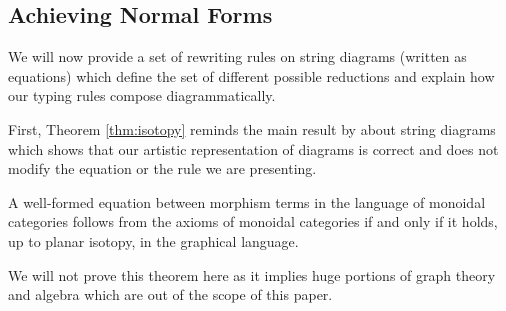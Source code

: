 \subsection{Achieving Normal Forms}
\label{subsec:normalforms}
We will now provide a set of rewriting rules on string diagrams (written as
equations) which define the set of different possible reductions and explain
how our typing rules compose diagrammatically.

First, Theorem \ref{thm:isotopy} reminds the main result by
\cite{joyalGeometryTensorCalculus1991} about string diagrams which shows that
our artistic representation of diagrams is correct and does not modify the
equation or the rule we are presenting.
\begin{thm}
	\label{thm:isotopy}
	A well-formed equation between morphism terms in the language of monoidal
	categories follows from the axioms of monoidal categories if and only if it
	holds, up to planar isotopy, in the graphical language.
\end{thm}
We will not prove this theorem here as it implies huge portions of graph theory
and algebra which are out of the scope of this paper.

\medskip

